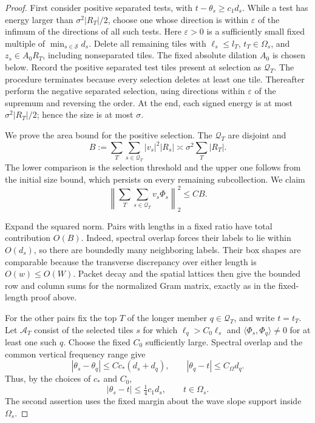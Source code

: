 \begin{proof}
First consider positive separated tests, with
\(t-\theta_s\geq c_1d_s\).  While a test has energy larger
than \(\sigma^2|R_T|/2\), choose one whose direction is within
\(\varepsilon\) of the infimum of the directions of all such
tests.  Here \(\varepsilon>0\) is a sufficiently small fixed
multiple of \(\min_{s\in\mathcal S}d_s\).  Delete all remaining
tiles with \(\ell_s\leq l_T\), \(t_T\in\Omega_s\), and
\(z_s\in A_0R_T\), including nonseparated tiles.  The fixed
absolute dilation \(A_0\) is chosen below.  Record the
positive separated test tiles present at selection as
\(\mathcal Q_T\).  The procedure terminates because every
selection deletes at least one tile.  Thereafter perform the
negative separated selection, using directions within
\(\varepsilon\) of the supremum and reversing the order.
At the end, each signed energy is at most
\(\sigma^2|R_T|/2\); hence the size is at most \(\sigma\).

We prove the area bound for the positive selection.  The
\(\mathcal Q_T\) are disjoint and
\begin{equation}\label{tile:eq-selected-energy}
 B:=\sum_T\sum_{s\in\mathcal Q_T}|v_s|^2|R_s|
       \asymp \sigma^2\sum_T|R_T|.
\end{equation}
The lower comparison is the selection threshold and the
upper one follows from the initial size bound, which
persists on every remaining subcollection.  We claim
\begin{equation}\label{tile:eq-selected-bessel}
 \left\|\sum_T\sum_{s\in\mathcal Q_T}v_s\Phi_s\right\|_2^2
 \leq CB.
\end{equation}

Expand the squared norm.  Pairs with lengths in a fixed
ratio have total contribution \(O(B)\).  Indeed, spectral
overlap forces their labels to lie within \(O(d_s)\), so
there are boundedly many neighboring labels.  Their box
shapes are comparable because the transverse discrepancy
over either length is \(O(w)\leq O(W)\).  Packet decay and
the spatial lattices then give the bounded row and column
sums for the normalized Gram matrix, exactly as in the
fixed-length proof above.

For the other pairs fix the top \(T\) of the longer member
\(q\in\mathcal Q_T\), and write \(t=t_T\).  Let
\(\mathcal A_T\) consist of the selected tiles \(s\) for which
\(\ell_q>C_0\ell_s\) and
\(\langle\Phi_s,\Phi_q\rangle\ne0\) for at least one such
\(q\).  Choose the fixed \(C_0\) sufficiently large.
Spectral overlap and the common vertical frequency range
give
\[
 |\theta_s-\theta_q|\leq Cc_*(d_s+d_q),\qquad
 |\theta_q-t|\leq C_\Omega d_q.
\]
Thus, by the choices of \(c_*\) and \(C_0\),
\begin{equation}\label{tile:eq-short-direction}
 |\theta_s-t|\leq \tfrac14 c_1d_s,
 \qquad t\in\Omega_s.
\end{equation}
The second assertion uses the fixed margin about the wave
slope support inside \(\Omega_s\).


\end{proof}

